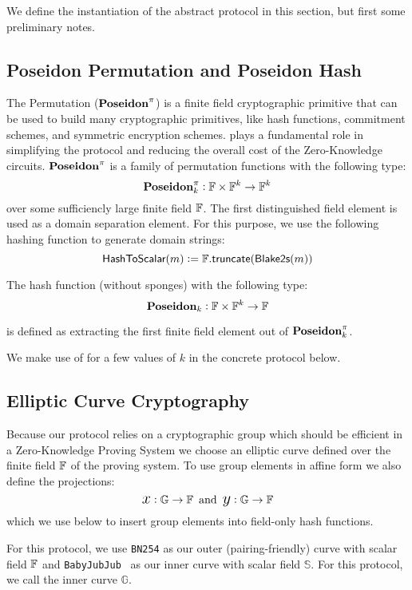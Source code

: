 
We define the instantiation of the abstract protocol in this section, but first some preliminary notes.
 
\subsection{Poseidon Permutation and Poseidon Hash}
 
The \Poseidon{} Permutation (${\textbf{Poseidon}}^{\pi}$) \cite{KRRS21USENIX} is a finite field cryptographic primitive that can be used to build many cryptographic primitives, like hash functions, commitment schemes, and symmetric encryption schemes. \Poseidon{} plays a fundamental role in simplifying the \Transfer{} protocol and reducing the overall cost of the Zero-Knowledge circuits. ${\textbf{Poseidon}}^{\pi}$ is a family of permutation functions with the following type:
\[{\textbf{Poseidon}}^{\pi}_k : {\mathbb{F}} \times {\mathbb{F}}^k \to {\mathbb{F}}^k\]
over some sufficiencly large finite field ${\mathbb{F}}$. The first distinguished field element is used as a domain separation element. For this purpose, we use the following hashing function to generate domain strings:
\[{\textsf{HashToScalar}}(m) := {\mathbb{F}}.{\textsf{truncate}}(\textsf{Blake2s}(m))\]
 
The \Poseidon{} hash function (without sponges) with the following type:
\[{\textbf{Poseidon}}_k : {\mathbb{F}} \times {\mathbb{F}}^k \to {\mathbb{F}}\]

is defined as extracting the first finite field element out of ${\textbf{Poseidon}}^{\pi}_k$.
 
We make use of \Poseidon{} for a few values of $k$ in the concrete protocol below.

\subsection{Elliptic Curve Cryptography}

Because our protocol relies on a cryptographic group which should be efficient in a Zero-Knowledge Proving System we choose an elliptic curve defined over the finite field ${\mathbb{F}}$ of the proving system. To use group elements in affine form we also define the projections:
\[{\text{\Large $x$}} : {\mathbb{G}} \to {\mathbb{F}} \,\,\,\text{and}\,\,\, {\text{\Large $y$}} : {\mathbb{G}} \to {\mathbb{F}}\]
which we use below to insert group elements into field-only hash functions.
 
For this protocol, we use \texttt{BN254} as our outer (pairing-friendly) curve with scalar field ${\mathbb{F}}$ and \texttt{BabyJubJub}~\cite{eip2494} as our inner curve with scalar field $\mathbb{S}$. For this protocol, we call the inner curve $\mathbb{G}$.
 
